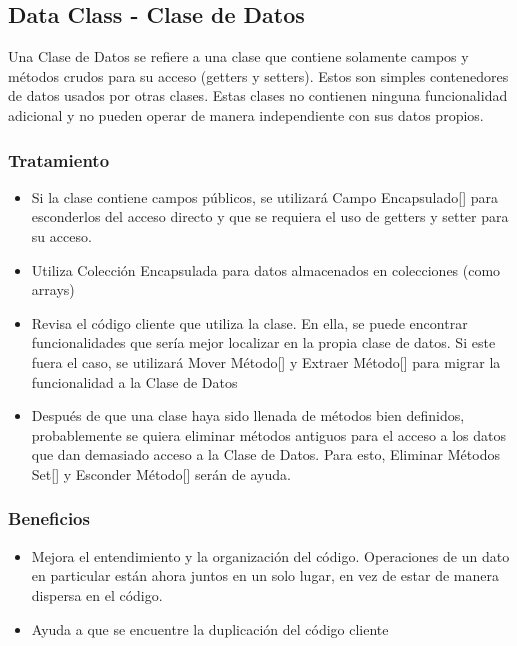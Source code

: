 \documentclass[11pt,a4paper,oneside]{book}
\begin{document}
\subsection{Data Class - Clase de Datos}
\label{dataClass}
Una Clase de Datos se refiere a una clase que contiene solamente campos y métodos crudos para su acceso (getters y setters). Estos son simples contenedores de datos usados por otras clases. Estas clases no contienen ninguna funcionalidad adicional y no pueden operar de manera independiente con sus datos propios.
\subsubsection{Tratamiento}
\begin{itemize}
    \item Si la clase contiene campos públicos, se utilizará Campo Encapsulado[\pageref{encapsulatefield}] para esconderlos del acceso directo y que se requiera el uso de getters y setter para su acceso.
    \item Utiliza Colección Encapsulada para datos almacenados en colecciones (como arrays)
    \item Revisa el código cliente que utiliza la clase. En ella, se puede encontrar funcionalidades que sería mejor localizar en la propia clase de datos. Si este fuera el caso, se utilizará Mover Método[\pageref{moveMethod}] y Extraer Método[\pageref{extractmethod}] para migrar la funcionalidad a la Clase de Datos
    \item Después de que una clase haya sido llenada de métodos bien definidos, probablemente se quiera eliminar métodos antiguos para el acceso a los datos que dan demasiado acceso a la Clase de Datos. Para esto, Eliminar Métodos Set[\pageref{removesettingmethod}] y Esconder Método[\pageref{hidemethod}] serán de ayuda.
\end{itemize}
\subsubsection{Beneficios}
\begin{itemize}
    \item Mejora el entendimiento y la organización del código. Operaciones de un dato en particular están ahora juntos en un solo lugar, en vez de estar de manera dispersa en el código.
    \item Ayuda a que se encuentre la duplicación del código cliente
\end{itemize}
\end{document}
